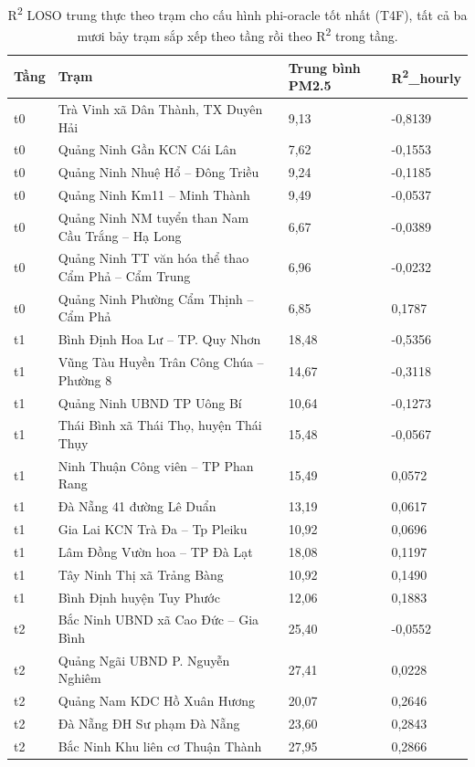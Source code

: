 {\small
\begin{longtable}{llll}
\caption{R\textsuperscript{2} LOSO trung thực theo trạm cho cấu hình phi-oracle tốt nhất (T4F), tất cả ba mươi bảy trạm sắp xếp theo tầng rồi theo R\textsuperscript{2} trong tầng.}\\
\toprule
\textbf{Tầng} & \textbf{Trạm} & \textbf{Trung bình PM2.5} & \textbf{R\textsuperscript{2}\_hourly} \\
\midrule\endhead
t0 & Trà Vinh xã Dân Thành, TX Duyên Hải & 9,13 & -0,8139 \\
t0 & Quảng Ninh Gần KCN Cái Lân & 7,62 & -0,1553 \\
t0 & Quảng Ninh Nhuệ Hổ -- Đông Triều & 9,24 & -0,1185 \\
t0 & Quảng Ninh Km11 -- Minh Thành & 9,49 & -0,0537 \\
t0 & Quảng Ninh NM tuyển than Nam Cầu Trắng -- Hạ Long & 6,67 & -0,0389 \\
t0 & Quảng Ninh TT văn hóa thể thao Cẩm Phả -- Cẩm Trung & 6,96 & -0,0232 \\
t0 & Quảng Ninh Phường Cẩm Thịnh -- Cẩm Phả & 6,85 & 0,1787 \\
t1 & Bình Định Hoa Lư -- TP. Quy Nhơn & 18,48 & -0,5356 \\
t1 & Vũng Tàu Huyền Trân Công Chúa -- Phường 8 & 14,67 & -0,3118 \\
t1 & Quảng Ninh UBND TP Uông Bí & 10,64 & -0,1273 \\
t1 & Thái Bình xã Thái Thọ, huyện Thái Thụy & 15,48 & -0,0567 \\
t1 & Ninh Thuận Công viên -- TP Phan Rang & 15,49 & 0,0572 \\
t1 & Đà Nẵng 41 đường Lê Duẩn & 13,19 & 0,0617 \\
t1 & Gia Lai KCN Trà Đa -- Tp Pleiku & 10,92 & 0,0696 \\
t1 & Lâm Đồng Vườn hoa -- TP Đà Lạt & 18,08 & 0,1197 \\
t1 & Tây Ninh Thị xã Trảng Bàng & 10,92 & 0,1490 \\
t1 & Bình Định huyện Tuy Phước & 12,06 & 0,1883 \\
t2 & Bắc Ninh UBND xã Cao Đức -- Gia Bình & 25,40 & -0,0552 \\
t2 & Quảng Ngãi UBND P. Nguyễn Nghiêm & 27,41 & 0,0228 \\
t2 & Quảng Nam KDC Hồ Xuân Hương & 20,07 & 0,2646 \\
t2 & Đà Nẵng ĐH Sư phạm Đà Nẵng & 23,60 & 0,2843 \\
t2 & Bắc Ninh Khu liên cơ Thuận Thành & 27,95 & 0,2866 \\

\end{longtable}}
